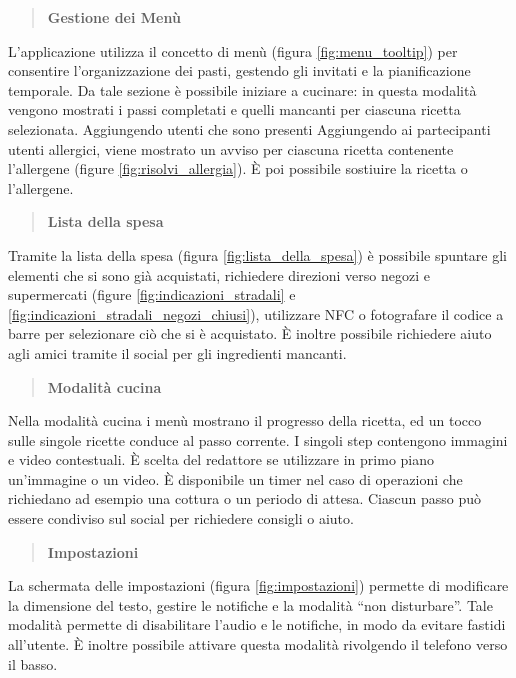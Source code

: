 \begin{quote}
 \textbf{Gestione dei Menù}
\end{quote}
L'applicazione utilizza il concetto di menù (figura \ref{fig:menu_tooltip}) per consentire l'organizzazione dei pasti, gestendo gli 
invitati e la pianificazione temporale. Da tale sezione è possibile iniziare a cucinare: in questa modalità vengono
mostrati i passi completati e quelli mancanti per ciascuna ricetta selezionata. Aggiungendo utenti che sono presenti
Aggiungendo ai partecipanti utenti allergici, viene mostrato un avviso per
ciascuna ricetta contenente l'allergene (figure \ref{fig:risolvi_allergia}).  È poi possibile sostiuire la ricetta o
l'allergene.

\begin{quote}
 \textbf{Lista della spesa}
\end{quote}
Tramite la lista della spesa (figura \ref{fig:lista_della_spesa}) è possibile
spuntare gli elementi che si sono già acquistati, richiedere direzioni verso
negozi e supermercati (figure \ref{fig:indicazioni_stradali} e
\ref{fig:indicazioni_stradali_negozi_chiusi}),
utilizzare NFC o fotografare il codice a barre per
selezionare ciò che si è acquistato. È inoltre possibile richiedere aiuto agli amici
tramite il social per gli ingredienti mancanti.

\begin{quote}
 \textbf{Modalità cucina}
\end{quote}
Nella modalità cucina i menù mostrano il progresso della ricetta, ed un tocco
sulle singole ricette conduce al passo corrente. I singoli step
contengono immagini e video contestuali. È scelta del redattore se utilizzare in primo piano un'immagine o un video.
È disponibile un timer nel caso di operazioni che richiedano ad esempio
una cottura o un periodo di attesa. Ciascun passo può essere condiviso sul social per richiedere consigli o aiuto.

\begin{quote}
 \textbf{Impostazioni}
\end{quote}
La schermata delle impostazioni (figura \ref{fig:impostazioni}) permette di modificare la dimensione del testo,
gestire le notifiche e la modalità ``non disturbare''. Tale modalità permette
di disabilitare l'audio e le notifiche, in modo da evitare fastidi all'utente.
È inoltre possibile attivare questa modalità rivolgendo il telefono verso il basso.

